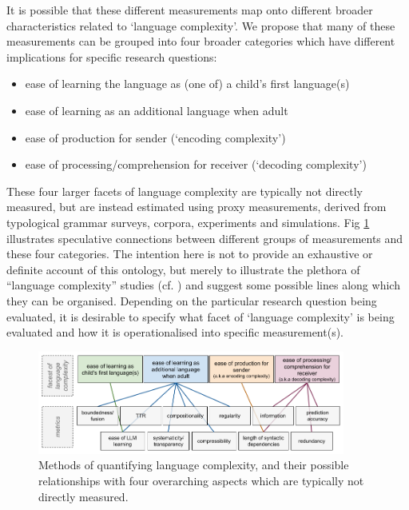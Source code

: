 \documentclass[USenglish]{article}
\begin{document}
It is possible that these different measurements map onto different broader characteristics related to `language complexity'. We propose that many of these measurements can be grouped into four broader categories which have different implications for specific research questions:

\begin{itemize}
\item ease of learning the language as (one of) a child's first language(s)
\item ease of learning as an additional language when adult
\item ease of production for sender (`encoding complexity')
\item ease of processing/comprehension for receiver (`decoding complexity')
\end{itemize}
\FloatBarrier

These four larger facets of language complexity are typically not directly measured, but are instead estimated using proxy measurements, derived from typological grammar surveys, corpora, experiments and simulations. 
Fig \ref{fig:metrics_diagram} illustrates speculative connections between different groups of measurements and these four categories. 
The intention here is not to provide an exhaustive or definite account of this ontology, but merely to illustrate the plethora of ``language complexity'' studies (cf. \citet{bentz2023complexity}) and suggest some possible lines along which they can be organised.
Depending on the particular research question being evaluated, it is desirable to specify what facet of `language complexity' is being evaluated and how it is operationalised into specific measurement(s). %

\begin{figure}[ht]
    \centering
    \includegraphics[width=0.9\textwidth]{latex/graphics/ud_complexity_metrics.png} %
    \caption{Methods of quantifying language complexity, and their possible relationships with four overarching aspects which are typically not directly measured.}
    \label{fig:metrics_diagram}
\end{figure}
\FloatBarrier
\end{document}
